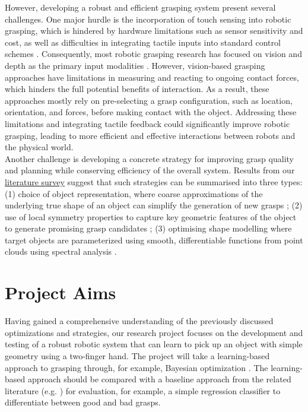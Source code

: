 \documentclass[11pt, a4paper]{report}
\theoremstyle{definition}
\begin{document}
However, developing a robust and efficient grasping system present several challenges. One major hurdle is the incorporation of touch sensing into robotic grasping, which is hindered by hardware limitations such as sensor sensitivity and cost, as well as difficulties in integrating tactile inputs into standard control schemes \cite{Calandra_2018}. Consequently, most robotic grasping research has focused on vision and depth as the primary input modalities \cite{Calandra_2018}. However, vision-based grasping approaches have limitations in measuring and reacting to ongoing contact forces, which hinders the full potential benefits of interaction. As a result, these approaches mostly rely on pre-selecting a grasp configuration, such as location, orientation, and forces, before making contact with the object. Addressing these limitations and integrating tactile feedback could significantly improve robotic grasping, leading to more efficient and effective interactions between robots and the physical world.\\

Another challenge is developing a concrete strategy for improving grasp quality and planning while conserving efficiency of the overall system. Results from our \hyperref[chap:2]{literature survey} suggest that such strategies can be summarised into three types: (1) choice of object representation, where coarse approximations of the underlying true shape of an object can simplify the generation of new grasps \cite{de_Farias_2021} \cite{geidenstam_2009}; (2) use of local symmetry properties to capture key geometric features of the object to generate promising grasp candidates \cite{de_Farias_2021} \cite{przybylski}; (3) optimising shape modelling where target objects are parameterized using smooth, differentiable functions from point clouds using spectral analysis \cite{de_Farias_2021}.


\section{Project Aims}
\label{sec:1.2}
Having gained a comprehensive understanding of the previously discussed optimizations and strategies, our research project focuses on the development and testing of a robust robotic system that can learn to pick up an object with simple geometry using a two-finger hand. The project will take a learning-based approach to grasping through, for example, Bayesian optimization \cite{nogueira2016unscented, frazier2018tutorial}. The learning-based approach should be compared with a baseline approach from the related literature (e.g. \cite{nogueira2016unscented, danielczuk2020exploratory, breyer2020volumetric1}) for evaluation, for example, a simple regression classifier to differentiate between good and bad grasps.
\end{document}
